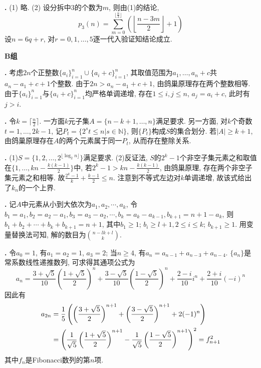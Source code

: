 \par \textbf{\thesolenum .} (1) 略. (2) 设分拆中3的个数为$m$, 则由(1)的结论, 
\begin{equation}
    p_3(n) = \sum_{m=0}^{\lfloor \frac{n}{3} \rfloor} \left(\left\lfloor \frac{n-3m}{2} \right\rfloor +1\right)
\end{equation}
设$n=6q+r$, 对$r=0,1,\dots,5$逐一代入验证知结论成立. 

\par \textbf{B组}
\par \textbf{\thesolenum .} \cite{IC} 考虑$2n$个正整数$\{a_i\}_{i=1}^n \cup \{a_i+c\}_{i=1}^n$, 其取值范围为$a_1,\dots,a_n+c$共$a_n-a_1+c+1$个整数. 由于$2n>a_n-a_1+c+1$, 由鸽巢原理存在两个整数相等. 由于$\{a_i\}_{i=1}^n$与$\{a_i+c\}_{i=1}^n$均严格单调递增, 存在$1\le i,j\le n$, $a_j=a_i+c$, 此时有$j>i$. 

\par \textbf{\thesolenum .} 令$k=\lceil \frac{n}{2}\rceil$. 一方面$k$元子集$A=\{n-k+1,\dots,n\}$满足要求. 另一方面, 对$k$个奇数$t=1,\dots, 2k-1$, 记$P_t=\{2^s t \le n\vert s\in \mathbb{N}\}$, 则$\{P_t\}$构成$S$的集合划分. 若$|A|\ge k+1$, 由鸽巢原理存在$A$的两个元素属于同一$P_t$, 从而存在整除关系. 

\par \textbf{\thesolenum .} (1)$S=\{1,2,\dots, 2^{\lfloor \log_2 n \rfloor}\}$满足要求. (2)反证法, $S$的$2^{k}-1$个非空子集元素之和取值在$\{1,\dots,kn-\frac{k(k-1)}{2}\}$中, 若$2^{k}-1 > kn-\frac{k(k-1)}{2}$, 由鸽巢原理, 存在两个非空子集元素之和相等. 故$\frac{2^{k}-1}{k}+\frac{k-1}{2}\le n$. 注意到不等式左边对$k$单调递增, 故该式给出了$k_n$的一个上界. 

\par \textbf{\thesolenum .} 记$A$中元素从小到大依次为$a_1,a_2,\cdots,a_k$, 令$b_1=a_1, b_2=a_2-a_1, b_3=a_3-a_2, \cdots, b_k=a_k-a_{k-1}, b_{k+1}=n+1-a_k$, 则$b_1+b_2+\cdots+b_k+b_{k+1}=n+1$, 其中$b_1\ge 1$; $b_i\ge l+1, 2\le i\le k$; $b_{k+1}\ge 1$. 用变量替换法可知, 解的数目为$\binom{n-lk+l}{k}$.

\par \textbf{\thesolenum .} 令$a_0=1$, 有$a_1=a_2=1$, $a_3=2$; 当$n\ge 4$, 有$a_n=a_{n-1}+a_{n-3}+a_{n-4}$. $\{a_n\}$是常系数线性递推数列, 可求得其通项公式为
\begin{equation}
    a_n = \frac{3+\sqrt{5}}{10}\left(\frac{1+\sqrt{5}}{2}\right)^n + \frac{3-\sqrt{5}}{10}\left(\frac{1-\sqrt{5}}{2}\right)^n + \frac{2-i}{10} i^n + \frac{2+i}{10} (-i)^n
\end{equation}
因此有
\begin{align}
    a_{2n} &= \frac{1}{5}\left(\left(\frac{3+\sqrt{5}}{2}\right)^{n+1} + \left(\frac{3-\sqrt{5}}{2}\right)^{n+1} + 2(-1)^n\right) \notag \\
    &= \left(\frac{1}{\sqrt{5}} \left(\frac{1+\sqrt{5}}{2}\right)^{n+1} - \frac{1}{\sqrt{5}}\left(\frac{1-\sqrt{5}}{2}\right)^{n+1}\right)^2 = f_{n+1}^2
\end{align}
其中$f_n$是Fibonacci数列的第$n$项. 

